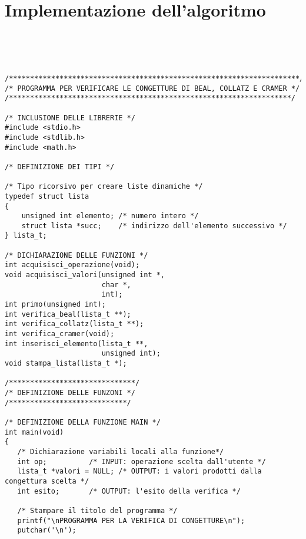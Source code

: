 \documentclass[10pt]{report}
\begin{document}
\newpage

\section{Implementazione dell'algoritmo}
\\
\\
\begin{lstlisting}[label = {lst:codiceSorgente}]

/*********************************************************************/
/* PROGRAMMA PER VERIFICARE LE CONGETTURE DI BEAL, COLLATZ E CRAMER */
/*******************************************************************/

/* INCLUSIONE DELLE LIBRERIE */
#include <stdio.h>
#include <stdlib.h>
#include <math.h>

/* DEFINIZIONE DEI TIPI */

/* Tipo ricorsivo per creare liste dinamiche */
typedef struct lista 
{
	unsigned int elemento; /* numero intero */
	struct lista *succ;    /* indirizzo dell'elemento successivo */
} lista_t; 

/* DICHIARAZIONE DELLE FUNZIONI */
int acquisisci_operazione(void); 
void acquisisci_valori(unsigned int *, 
                       char *, 
					   int);
int primo(unsigned int);
int verifica_beal(lista_t **);
int verifica_collatz(lista_t **);  
int verifica_cramer(void);
int inserisci_elemento(lista_t **, 
                       unsigned int);
void stampa_lista(lista_t *);

/******************************/
/* DEFINIZIONE DELLE FUNZONI */
/****************************/

/* DEFINIZIONE DELLA FUNZIONE MAIN */
int main(void)
{   
   /* Dichiarazione variabili locali alla funzione*/
   int op;          /* INPUT: operazione scelta dall'utente */
   lista_t *valori = NULL; /* OUTPUT: i valori prodotti dalla congettura scelta */
   int esito;       /* OUTPUT: l'esito della verifica */  

   /* Stampare il titolo del programma */
   printf("\nPROGRAMMA PER LA VERIFICA DI CONGETTURE\n");
   putchar('\n');	
   

\end{lstlisting}
\end{document}
